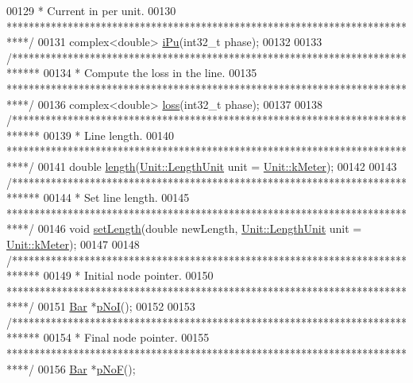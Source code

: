 \begin{DoxyCode}
00129 \textcolor{comment}{   * Current in per unit.}
00130 \textcolor{comment}{   ****************************************************************************/}
00131   complex<double> \hyperlink{group___models_ga8f71e477800134586652d283087ed373}{iPu}(int32\_t phase);
00132 
00133   \textcolor{comment}{/*****************************************************************************}
00134 \textcolor{comment}{   * Compute the loss in the line.}
00135 \textcolor{comment}{   ****************************************************************************/}
00136   complex<double> \hyperlink{group___models_ga84ddf17bee846a6f21c44d463252dd25}{loss}(int32\_t phase);
00137 
00138   \textcolor{comment}{/*****************************************************************************}
00139 \textcolor{comment}{   * Line length.}
00140 \textcolor{comment}{   ****************************************************************************/}
00141   \textcolor{keywordtype}{double} \hyperlink{group___models_gae2e4500d0fa60dcc2ecb08b2c96954f9}{length}(\hyperlink{class_unit_a8c8921f7b225ad6063b1cb573425b9a0}{Unit::LengthUnit} unit = \hyperlink{class_unit_a8c8921f7b225ad6063b1cb573425b9a0abfa41ebe7ee649a1f02c9b8ae570434b}{Unit::kMeter});
00142 
00143   \textcolor{comment}{/*****************************************************************************}
00144 \textcolor{comment}{  * Set line length.}
00145 \textcolor{comment}{  ****************************************************************************/}
00146   \textcolor{keywordtype}{void} \hyperlink{group___models_ga950d0b8f5d167eda430c65ca7adadbb0}{setLength}(\textcolor{keywordtype}{double} newLength, \hyperlink{class_unit_a8c8921f7b225ad6063b1cb573425b9a0}{Unit::LengthUnit} unit = 
      \hyperlink{class_unit_a8c8921f7b225ad6063b1cb573425b9a0abfa41ebe7ee649a1f02c9b8ae570434b}{Unit::kMeter});
00147 
00148   \textcolor{comment}{/*****************************************************************************}
00149 \textcolor{comment}{   * Initial node pointer.}
00150 \textcolor{comment}{   ****************************************************************************/}
00151   \hyperlink{class_bar}{Bar} *\hyperlink{group___models_gaeafd90e84ac2f8de2a879abe9e53eef3}{pNoI}();
00152 
00153   \textcolor{comment}{/*****************************************************************************}
00154 \textcolor{comment}{   * Final node pointer.}
00155 \textcolor{comment}{   ****************************************************************************/}
00156   \hyperlink{class_bar}{Bar} *\hyperlink{group___models_gabbc73ddedd3075c33ae5331bd7c9829f}{pNoF}();

\end{DoxyCode}
